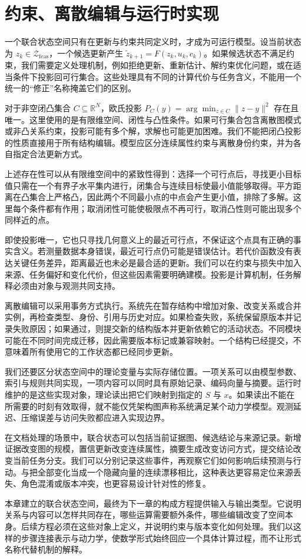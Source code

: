 \section{约束、离散编辑与运行时实现}
\label{sec:meaning_dynamics}

一个联合状态空间只有在更新与约束共同定义时，才成为可运行模型。设当前状态为 $z_k\in\mathcal Z_{\mathrm{feas}}$，一个候选更新产生 $\widetilde z_{k+1}=F(z_k,u_k,c_k)$。如果候选状态不满足约束，我们需要定义处理机制，例如拒绝更新、重新估计、解约束优化问题，或在适当条件下投影回可行集合。这些处理具有不同的计算代价与任务含义，不能用一个统一的“修正”名称掩盖它们的区别。

对于非空闭凸集合 $C\subseteq\mathbb R^N$，欧氏投影 $P_C(y)=\arg\min_{z\in C}\|z-y\|^2$ 存在且唯一。这里使用的是有限维空间、闭性与凸性条件。如果可行集合包含离散图模式或非凸关系约束，投影可能有多个解，求解也可能更加困难。我们不能把闭凸投影的性质直接用于所有结构编辑。模型应区分连续属性约束与离散身份约束，并为各自指定合法更新方式。

上述存在性可以从有限维空间中的紧致性得到：选择一个可行点后，寻找更小目标值只需在一个有界子水平集内进行，闭集合与连续目标使最小值能够取得。平方距离在凸集合上严格凸，因此两个不同最小点的中点会产生更小值，排除了多解。这里每个条件都有作用；取消闭性可能使极限点不再可行，取消凸性则可能出现多个同样近的点。

即使投影唯一，它也只寻找几何意义上的最近可行点，不保证这个点具有正确的事实含义。若测量数据本身错误，最近可行点仍可能是错误估计。若代价函数没有表达关键任务差异，距离最近也未必是最合适的更新。我们可以在约束与损失中加入来源、任务偏好和变化代价，但这些因素需要明确建模。投影是计算机制，任务解释必须由对象与观测共同支持。

离散编辑可以采用事务方式执行。系统先在暂存结构中增加对象、改变关系或合并实例，再检查类型、身份、引用与历史对应。如果检查失败，系统保留原版本并记录失败原因；如果通过，则提交新的结构版本并更新依赖它的活动状态。不同模块可能在不同时间完成迁移，因此需要版本标记或兼容映射。一个结构已经提交，不意味着所有使用它的工作状态都已经同步更新。

我们还要区分状态空间中的理论变量与实际存储位置。一项关系可以由模型参数、索引与规则共同实现，一项内容可以同时具有原始记录、编码向量与摘要。运行时维护的是这些实现对象，理论读出把它们映射到指定的 $S$ 与 $x$。如果读出不能在所需要的时刻有效取得，就不能仅凭架构图声称系统满足某个动力学模型。观测延迟、压缩误差与访问失败都应进入实现边界。

在文档处理的场景中，联合状态可以包括当前证据图、候选结论与来源记录。新增证据改变图的规模，置信更新改变连续属性，摘要生成改变访问方式，提交结论改变当前任务分支。我们可以分别记录这些事件，再观察它们如何影响后续预测与行动。与把全部变化当成一个隐藏向量的连续漂移相比，这种表达更容易定位来源丢失、角色混淆或版本冲突，也更容易设计针对性的修复。

本章建立的联合状态空间，最终为下一章的构成方程提供输入与输出类型。它说明关系与内容可以怎样共同存在，哪些运算需要额外条件，哪些编辑改变了空间本身。后续方程必须在这些对象上定义，并说明约束与版本变化如何处理。我们以这样的步骤连接表示与动力学，使数学形式始终回应一个具体计算过程，而不让形式名称代替机制的解释。
